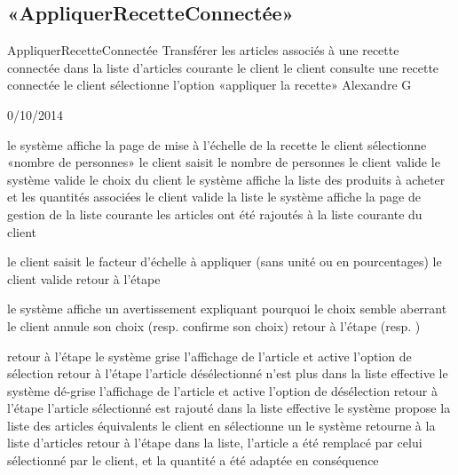 \subsection{«AppliquerRecetteConnectée»}

\startCU
\nom AppliquerRecetteConnectée
\but Transférer les articles associés à une recette connectée dans la liste d'articles courante
\acteur le client
\precondition le client consulte une recette connectée 
\declenchement le client sélectionne l'option «appliquer la recette»
\auteur Alexandre G
\date 30/10/2014

\nominal %
\startnominal
\etape[DEBUT] le système affiche la page de mise à l'échelle de la recette
\etape[ZOOM] le client sélectionne «nombre de personnes» 
\etape le client saisit le nombre de personnes
\etape le client valide
\etape[VALIDATION] le système valide le choix du client
\etape[AFFICHAGE] le système affiche la liste des produits à acheter et les quantités associées
\etape[MODIFS] le client valide la liste
\etape le système affiche la page de gestion de la liste courante
\stopnominal
\postcondition les articles ont été rajoutés à la liste courante du client

\alternatifs 
\startalternatif[ZOOM] 
  \etape le client saisit le facteur d'échelle à appliquer (sans unité ou en pourcentages)
  \etape le client valide
  \etape retour à l'étape \in[VALIDATION]
\stopcondition
\stopalternatif

\startalternatif[VALIDATION] 
  \etape le système affiche un avertissement expliquant pourquoi le choix semble aberrant
  \etape le client annule son choix (resp. confirme son choix)
  \etape retour à l'étape \in[DEBUT] (resp. \in[AFFICHAGE])
\stopcondition
\stopalternatif

\startalternatif[MODIFS] 
  \etape retour à l'étape \in[DEBUT]
\stopcondition
{} 
  \etape le système grise l'affichage de l'article et active l'option de sélection
  \etape retour à l'étape \in[MODIFS]
\stopcondition
\postcondition l'article désélectionné n'est plus dans la liste effective
  \etape le système dé-grise l'affichage de l'article et active l'option de désélection
  \etape retour à l'étape \in[MODIFS]
\stopcondition
\postcondition l'article sélectionné est rajouté dans la liste effective
  \etape le système propose la liste des articles équivalents
  \etape le client en sélectionne un
  \etape le système retourne à la liste d'articles
  \etape retour à l'étape \in[MODIFS]
\stopcondition
\postcondition dans la liste, l'article a été remplacé par celui sélectionné par le client, et la quantité a été adaptée en conséquence
\stopalternatif


